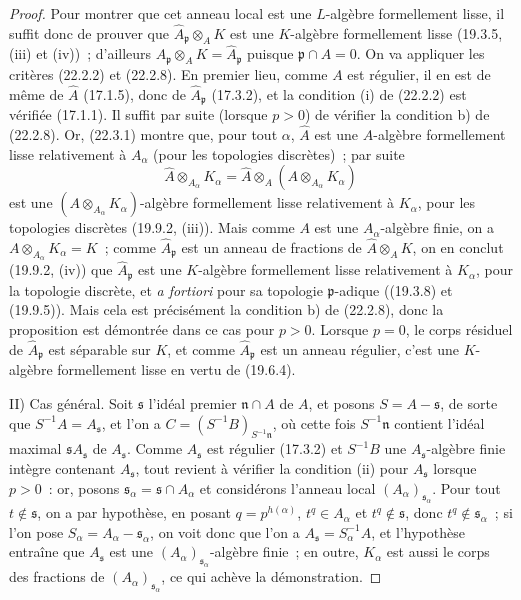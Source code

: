 \begin{proof}
Pour montrer que cet anneau local est une $L$-algèbre formellement lisse,
il suffit donc de prouver que $\widehat A_\mathfrak p\otimes_A K$ est une
$K$-algèbre formellement lisse (19.3.5, (iii) et (iv))~; d'ailleurs
$\widehat A_\mathfrak p\otimes_A K=\widehat A_\mathfrak p$ puisque
$\mathfrak p\cap A=0$. On va appliquer les critères (22.2.2) et (22.2.8).
En premier lieu, comme $A$ est régulier, il en est de même de $\widehat A$
(17.1.5), donc de $\widehat A_\mathfrak p$ (17.3.2), et la condition (i) de
(22.2.2) est vérifiée (17.1.1). Il suffit par suite (lorsque $p>0$) de
vérifier la condition b) de (22.2.8). Or, (22.3.1) montre que, pour tout
$\alpha$, $\widehat A$ est une $A$-algèbre formellement lisse relativement
à $A_\alpha$ (pour les topologies discrètes)~; par suite
\[
  \widehat A\otimes_{A_\alpha}K_\alpha
  =\widehat A\otimes_A(A\otimes_{A_\alpha}K_\alpha)
\]
est une $(A\otimes_{A_\alpha}K_\alpha)$-algèbre formellement lisse
relativement à $K_\alpha$, pour les topologies discrètes (19.9.2, (iii)).
Mais comme $A$ est une $A_\alpha$-algèbre finie, on a
$A\otimes_{A_\alpha}K_\alpha=K$~; comme $\widehat A_\mathfrak p$ est un
anneau de fractions de $\widehat A\otimes_A K$, on en conclut (19.9.2,
(iv)) que $\widehat A_\mathfrak p$ est une $K$-algèbre formellement lisse
relativement à $K_\alpha$, pour la topologie discrète, et \emph{a fortiori}
pour sa topologie $\mathfrak p$-adique ((19.3.8) et (19.9.5)). Mais cela est
précisément la condition b) de (22.2.8), donc la proposition est démontrée
dans ce cas pour $p>0$. Lorsque $p=0$, le corps résiduel de
$\widehat A_\mathfrak p$ est séparable sur $K$, et comme
$\widehat A_\mathfrak p$ est un anneau régulier, c'est une $K$-algèbre
formellement lisse en vertu de (19.6.4).

II) Cas général. Soit $\mathfrak s$ l'idéal premier $\mathfrak n\cap A$ de
$A$, et posons $S=A-\mathfrak s$, de sorte que $S^{-1}A=A_\mathfrak s$, et
l'on a $C=(S^{-1}B)_{S^{-1}\mathfrak n}$, où cette fois
$S^{-1}\mathfrak n$ contient l'idéal maximal
$\mathfrak sA_\mathfrak s$ de $A_\mathfrak s$. Comme $A_\mathfrak s$ est
régulier (17.3.2) et $S^{-1}B$ une $A_\mathfrak s$-algèbre finie intègre
contenant $A_\mathfrak s$, tout revient à vérifier la condition (ii) pour
$A_\mathfrak s$ lorsque $p>0$~: or, posons
$\mathfrak s_\alpha=\mathfrak s\cap A_\alpha$ et considérons l'anneau local
$(A_\alpha)_{\mathfrak s_\alpha}$. Pour tout $t\notin\mathfrak s$, on a par
hypothèse, en posant $q=p^{h(\alpha)}$, $t^q\in A_\alpha$ et
$t^q\notin\mathfrak s$, donc $t^q\notin\mathfrak s_\alpha$~; si l'on pose
$S_\alpha=A_\alpha-\mathfrak s_\alpha$, on voit donc que l'on a
$A_\mathfrak s=S_\alpha^{-1}A$, et l'hypothèse entraîne que
$A_\mathfrak s$ est une $(A_\alpha)_{\mathfrak s_\alpha}$-algèbre finie~;
en outre, $K_\alpha$ est aussi le corps des fractions de
$(A_\alpha)_{\mathfrak s_\alpha}$, ce qui achève la démonstration.
\end{proof}

